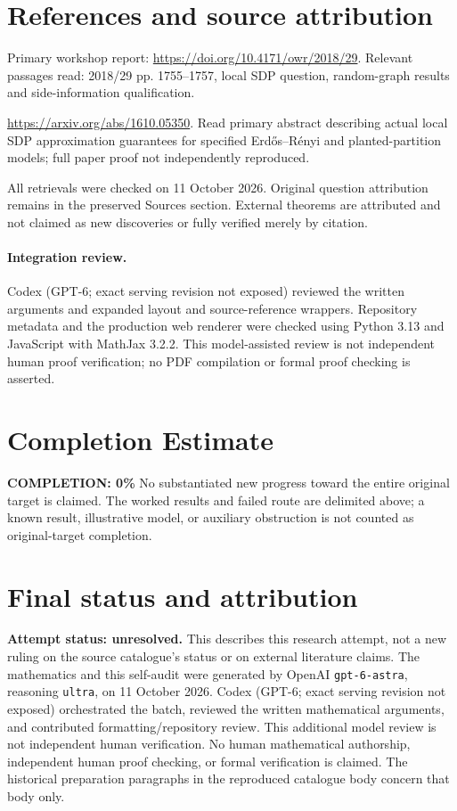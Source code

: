 \documentclass[11pt]{article}
\begin{document}
\section{References and source attribution}
Primary workshop report: \url{https://doi.org/10.4171/owr/2018/29}. Relevant passages read: 2018/29 pp. 1755--1757, local SDP question, random-graph results and side-information qualification.

\url{https://arxiv.org/abs/1610.05350}. Read primary abstract describing actual local SDP approximation guarantees for specified Erdős--Rényi and planted-partition models; full paper proof not independently reproduced.

All retrievals were checked on 11 October 2026. Original question attribution remains in the preserved Sources section. External theorems are attributed and not claimed as new discoveries or fully verified merely by citation.


\paragraph{Integration review.} Codex (GPT-6; exact serving revision not exposed) reviewed the written arguments and expanded layout and source-reference wrappers. Repository metadata and the production web renderer were checked using Python 3.13 and JavaScript with MathJax 3.2.2. This model-assisted review is not independent human proof verification; no PDF compilation or formal proof checking is asserted.

\section{Completion Estimate}
\noindent\textbf{COMPLETION: 0\%}
No substantiated new progress toward the entire original target is claimed. The worked results and failed route are delimited above; a known result, illustrative model, or auxiliary obstruction is not counted as original-target completion.

\section{Final status and attribution}
\textbf{Attempt status: unresolved.} This describes this research attempt, not a new ruling on the source catalogue's status or on external literature claims.
The mathematics and this self-audit were generated by OpenAI \texttt{gpt-6-astra}, reasoning \texttt{ultra}, on 11 October 2026. Codex (GPT-6; exact serving revision not exposed) orchestrated the batch, reviewed the written mathematical arguments, and contributed formatting/repository review. This additional model review is not independent human verification. No human mathematical authorship, independent human proof checking, or formal verification is claimed. The historical preparation paragraphs in the reproduced catalogue body concern that body only.
\end{document}
